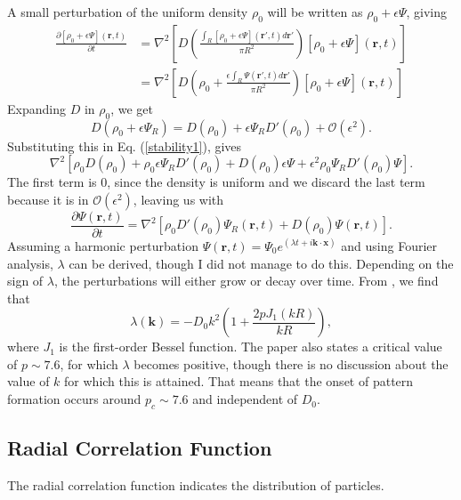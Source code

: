 \documentclass{article}
\renewcommand{\vec}[1]{\boldsymbol{#1}}
\begin{document}
A small perturbation of the uniform density $\rho_0$ will be written as $\rho_0 + \epsilon \Psi$, giving
\begin{align}
    \frac{\partial[\rho_0 + \epsilon \Psi](\vec{r},t)}{\partial t} &= \nabla^2\left[D\left(\frac{\int_{R} [\rho_0+\epsilon \Psi](\vec{r}',t)d\vec{r}'}{\pi R^2}\right)[\rho_0+\epsilon \Psi](\vec{r},t)\right]\\
    &= \nabla^2\left[D\left(\rho_0+\frac{\epsilon\int_{R} \Psi(\vec{r}',t)d\vec{r}'}{\pi R^2}\right)[\rho_0+\epsilon \Psi](\vec{r},t)\right] \label{stability1}
\end{align}
Expanding $D$ in $\rho_0$, we get 
\begin{equation}
    D(\rho_0+\epsilon \Psi_R) = D(\rho_0) + \epsilon \Psi_R D'(\rho_0) + \mathcal{O}(\epsilon^2).
\end{equation}
Substituting this in Eq. (\ref{stability1}), gives
\begin{equation}
\nabla^2\left[\rho_0 D(\rho_0) + \rho_0\epsilon \Psi_R D'(\rho_0)+ D(\rho_0)\epsilon \Psi + \epsilon^2 \rho_0 \Psi_R D'(\rho_0) \Psi\right].
\end{equation}
The first term is $0$, since the density is uniform and we discard the last term because it is in $\mathcal{O}(\epsilon^2)$, leaving us with
\begin{equation}
    \frac{\partial \Psi(\vec{r},t)}{\partial t} = \nabla^2\left[ \rho_0  D'(\rho_0)\Psi_R(\vec{r},t)+ D(\rho_0) \Psi(\vec{r},t) \right].
\end{equation}
Assuming a harmonic perturbation $\Psi(\vec{r}, t) = \Psi_0 e^{(\lambda t + i \vec{k} \cdot \vec{x})}$ and using Fourier analysis, $\lambda$ can be derived, though I did not manage to do this.
Depending on the sign of $\lambda$, the perturbations will either grow or decay over time.
From \cite{lopezMacroscopicDescriptionParticle2006}, we find that 
\begin{equation}
    \lambda(\vec{k}) = -D_0 k^2\left(1 + \frac{2pJ_1(kR)}{kR}\right),
\end{equation}
where $J_1$ is the first-order Bessel function.
The paper also states a critical value of $p\sim 7.6$, for which $\lambda $ becomes positive, though there is no discussion about the value of $k$ for which this is attained. 
That means that the onset of pattern formation occurs around $p_c \sim 7.6$ and independent of $D_0$.

\subsection{Radial Correlation Function}
The radial correlation function indicates the distribution of particles. 
\end{document}
